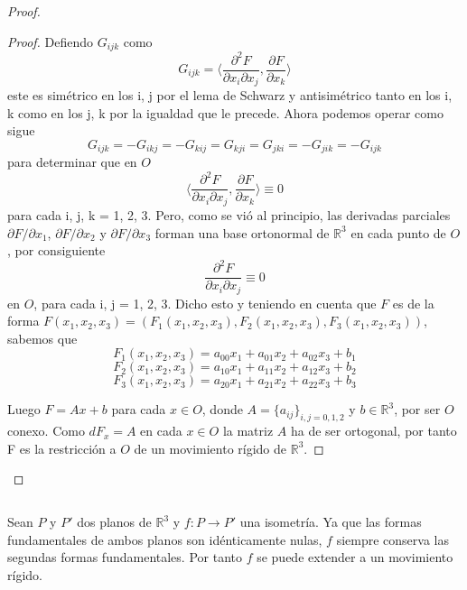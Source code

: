 \begin{proof}
\begin{proof}
		Defiendo $G_{ijk}$ como
		${ }$\\
		\[
		G_{ijk} = \langle \frac{\partial^2 F}{\partial x_i \partial x_j}, \frac{\partial F}{\partial x_k} \rangle
		\]
		${ }$\\
		este es simétrico en los i, j por el lema de Schwarz y antisimétrico tanto en los i, k como en los j, k por la igualdad que le precede. Ahora podemos operar como sigue
		${ }$\\
		\[
		G_{ijk} = -G_{ikj} = -G_{kij} = G_{kji} = G_{jki} = -G_{jik} = -G_{ijk}
		\]
		${ }$\\
		para determinar que en $O$
		${ }$\\
		\[
		\langle \frac{\partial^2 F}{\partial x_i \partial x_j}, \frac{\partial F}{\partial x_k} \rangle \equiv 0
		\]
		${ }$\\
		para cada i, j, k = 1, 2, 3. Pero, como se vió al principio, las derivadas parciales $\partial F / \partial x_1$, $\partial F / \partial x_2$ y $\partial F / \partial x_3$ forman una base ortonormal de $\mathbb{R}^3$ en cada punto de $O$, por consiguiente
		${ }$\\
		\[
		\frac{\partial^2 F}{\partial x_i \partial x_j} \equiv 0
		\]
		${ }$\\
		en $O$, para cada  i, j = 1, 2, 3. Dicho esto y teniendo en cuenta  que $F$ es de la forma $F(x_1, x_2, x_3) = (F_1(x_1, x_2, x_3), F_2(x_1, x_2, x_3), F_3(x_1, x_2, x_3))$, sabemos que
		${ }$\\
		\[
		F_1(x_1, x_2, x_3) = a_{00}x_1 + a_{01}x_2 + a_{02}x_3 + b_1
		\]
		\[
		F_2(x_1, x_2, x_3) = a_{10}x_1 + a_{11}x_2 + a_{12}x_3 + b_2
		\]
		\[
		F_3(x_1, x_2, x_3) = a_{20}x_1 + a_{21}x_2 + a_{22}x_3 + b_3
		\]
		
		${ }$\\	
		
		Luego $F = Ax + b$ para cada $x \in O$, donde $A = \{a_{ij}\}_{i,j=0,1,2}$ y $b \in \mathbb{R}^3$, por ser $O$ conexo. Como $dF_x=A$ en cada $x \in O$ la matriz $A$ ha de ser ortogonal, por tanto F es la restricción a $O$ de un movimiento rígido de $\mathbb{R}^3$.
		
	\end{proof}
	
\end{proof}
${ }$\\



\begin{ejemplo}
		Sean $P$ y $P'$ dos planos de $\mathbb{R}^3$ y $f : P \to P'$ una isometría. Ya que las formas fundamentales de ambos planos son idénticamente nulas, $f$ siempre conserva las segundas formas fundamentales. Por tanto $f$ se puede extender a un movimiento rígido.
\end{ejemplo}
${ }$\\

